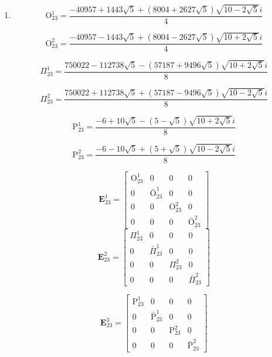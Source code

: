 \documentclass{article}
\begin{document}
\begin{enumerate}
\item \[ \mathrm{O}_{23}^{1}=\frac{-40957+1443\sqrt{5}+(8004+2627\sqrt{5})\sqrt{10-2\sqrt{5}}i}{4} \]

\[ \mathrm{O}_{23}^{2}=\frac{-40957-1443\sqrt{5}+(8004-2627\sqrt{5})\sqrt{10+2\sqrt{5}}i}{4} \]

\[ \Pi_{23}^{1}=\frac{750022-112738\sqrt{5}-(57187+9496\sqrt{5})\sqrt{10+2\sqrt{5}}i}{8} \]

\[ \Pi_{23}^{2}=\frac{750022+112738\sqrt{5}+(57187-9496\sqrt{5})\sqrt{10-2\sqrt{5}}i}{8} \]

\[ \mathrm{P}_{23}^{1}=\frac{-6+10\sqrt{5}-(5-\sqrt{5})\sqrt{10+2\sqrt{5}}i}{8} \]

\[ \mathrm{P}_{23}^{2}=\frac{-6-10\sqrt{5}+(5+\sqrt{5})\sqrt{10-2\sqrt{5}}i}{8} \]

\[ \boldsymbol{E}_{23}^{1}=\left[ \begin{matrix} \mathrm{O}_{23}^{1} & 0 & 0 & 0 \\ 0 & \bar{\mathrm{O}}_{23}^{1} & 0 & 0 \\ 0 & 0 & \mathrm{O}_{23}^{2} & 0 \\ 0 & 0 & 0 & \bar{\mathrm{O}}_{23}^{2} \end{matrix} \right] \]
\[ \boldsymbol{E}_{23}^{2}=\left[ \begin{matrix} \Pi_{23}^{1} & 0 & 0 & 0 \\ 0 & \bar{\Pi}_{23}^{1} & 0 & 0 \\ 0 & 0 & \Pi_{23}^{2} & 0 \\ 0 & 0 & 0 & \bar{\Pi}_{23}^{2} \end{matrix} \right] \]

\[ \boldsymbol{E}_{23}^{3}=\left[ \begin{matrix} \mathrm{P}_{23}^{1} & 0 & 0 & 0 \\ 0 & \bar{\mathrm{P}}_{23}^{1} & 0 & 0 \\ 0 & 0 & \mathrm{P}_{23}^{2} & 0 \\ 0 & 0 & 0 & \bar{\mathrm{P}}_{23}^{2} \end{matrix} \right] \]


\end{enumerate}
\end{document}
